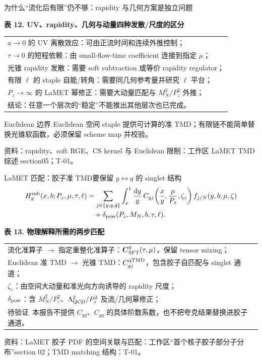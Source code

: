 \documentclass[UTF8,aspectratio=169,11pt]{ctexbeamer}
\newcommand{\source}[1]{%
  \par\vspace{-0.08em}%
  \noindent\parbox[t]{0.97\linewidth}{\raggedright\scriptsize\color{muted}资料：#1}\par}
\newcommand{\unverified}{\textcolor{warning}{待验证}}
\newcommand{\dd}{\mathrm{d}}
\begin{document}
\begin{frame}[t]{为什么“流化后有限”仍不够：rapidity 与几何方案是独立问题}
  \begin{center}
  \textbf{表 12. UV、rapidity、几何与动量四种发散/尺度的区分}
  \vspace{0.12em}
  {\scriptsize\begin{tabular}{@{}p{\linewidth}@{}}
    \toprule
    $a\to0$ 的 UV 离散效应：可由正流时间和连续外推控制；\\
    $\tau\to0$ 的短程依赖：由 small-flow-time coefficient 连接到指定 $\mu$；\\
    光锥 rapidity 发散：需要 soft subtraction 或等价 rapidity regulator；\\
    有限 $\ell$ 的 staple 自能/转角：需要同几何参考量并研究 $\ell$ 平台；\\
    $P_z\to\infty$ 的 LaMET 幂修正：需要大动量匹配与 $M_N^2/P_z^2$ 外推；\\
    结论：任意一个层次的“稳定”不能推出其他层次也已完成。\\
    \bottomrule
  \end{tabular}}
  \end{center}
  \begin{block}{Euclidean 边界}
    Euclidean 空间 staple 提供可计算的准 TMD；有限链不能简单替换光锥软函数，必须保留 scheme map 并校验。
  \end{block}
  \source{rapidity、soft RGE、CS kernel 与 Euclidean 限制：工作区 LaMET TMD 综述 section05；T-01。}
\end{frame}

\begin{frame}[t]{LaMET 匹配：胶子准 TMD要保留 $g\leftrightarrow q$ 的 singlet 结构}
  \begin{align*}
    H_{g}^{\rm sub}(x,b;P_z,\mu,\tau,\ell)
    &=\sum_{j\in\{g,q,\bar q\}}
      \int_x^1\frac{\dd y}{y}\,
      C_{gj}\!\left(\frac{x}{y},\frac{\mu}{P_z},\zeta_z\right)
      f_{j/N}(y,b;\mu,\zeta)\\[-0.1em]
    &\quad+\delta_{\rm pow}(P_z,M_N,b,\tau,\ell).
  \end{align*}
  \begin{center}
  \textbf{表 13. 物理解释所需的两步匹配}
  \vspace{0.12em}
  \begin{tabular}{@{}p{\linewidth}@{}}
    \toprule
    流化准算子 $\to$ 指定重整化准算子：$\boldsymbol C_{\rm SFT}^g(\tau,\mu)$，保留 tensor mixing；\\
    Euclidean 准 TMD $\to$ 光锥 TMD：$C_{gj}^{\rm qTMD}$，包含胶子自匹配与 singlet 通道；\\
    $\zeta_z$：由空间大动量和准光向方向诱导的 rapidity 尺度；\\
    $\delta_{\rm pow}$：含 $M_N^2/P_z^2$、$\Lambda_{\rm QCD}^2/P_z^2$ 及流/几何幂修正；\\
    \unverified\ 本报告不提供 $C_{gg}$、$C_{gq}$ 的具体阶数系数，也不把夸克结果替换进胶子通道。\\
    \bottomrule
  \end{tabular}
  \end{center}
  \source{LaMET 胶子 PDF 的空间关联与匹配：工作区“首个核子胶子部分子分布”section 02；TMD matching 结构：T-01。}
\end{frame}
\end{document}
